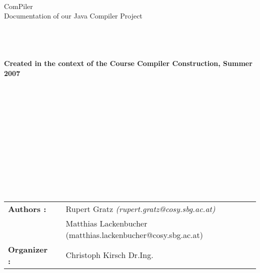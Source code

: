 \thispagestyle{empty}
\begin{center}

\end{center}
\begin{verbatim}





\end{verbatim}
\begin{center}
\huge{ComPiler}\\
\huge{Documentation of our Java Compiler Project}\\
\begin{verbatim}


\end{verbatim}

\end{center}
\begin{verbatim}


\end{verbatim}
\begin{center}
\Large\textbf{Created in the context of the Course Compiler Construction, Summer 2007}
\end{center}
\begin{verbatim}














\end{verbatim}
\begin{flushleft}
\begin{tabular}{lllll}
\textbf{Authors :} & &  Rupert Gratz \textsl{   (rupert.gratz@cosy.sbg.ac.at)}\\
& & Matthias Lackenbucher (matthias.lackenbucher@cosy.sbg.ac.at)
& & \\
\textbf{Organizer :} & &  Christoph Kirsch Dr.Ing.
\end{tabular}
\end{flushleft}
